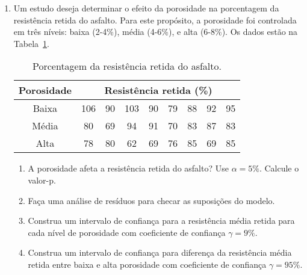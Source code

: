 \documentclass[11pt, a4paper]{article}
\begin{document}
\begin{enumerate}
	\item Um estudo deseja determinar o efeito da porosidade na porcentagem da resistência retida do asfalto. Para este propósito, a porosidade foi controlada em três níveis: baixa (2-4\%), média (4-6\%), e alta (6-8\%). Os dados estão na Tabela~\ref{tab:resistencia-retida}.
	\begin{table}[htbp]
		\centering
		\begin{tabular}{c|cccccccc}
			\toprule[0.05cm]
			Porosidade & \multicolumn{8}{|c}{Resistência retida (\%)}\\ \midrule[0.025cm]
			Baixa & 106 & 90 & 103 & 90 & 79 & 88 & 92 & 95\\
			Média & 80 & 69 & 94 & 91 & 70 & 83 & 87 & 83\\
			Alta & 78 & 80 & 62 & 69 & 76 & 85 & 69 & 85\\
			\bottomrule[0.05cm]
		\end{tabular}
		\caption{Porcentagem da resistência retida do asfalto.}
		\label{tab:resistencia-retida}
	\end{table}
	\begin{enumerate}
		\item A porosidade afeta a resistência retida do asfalto? Use $\alpha = 5\%$. Calcule o valor-p.
		\item Faça uma análise de resíduos para checar as suposições do modelo.
		\item Construa um intervalo de confiança para a resistência média retida para cada nível de porosidade com coeficiente de confiança $\gamma=9\%$.
		\item Construa um intervalo de confiança para diferença da resistência média retida entre baixa e alta porosidade com coeficiente de confiança $\gamma=95\%$.
	\end{enumerate}


\end{enumerate}
\end{document}
